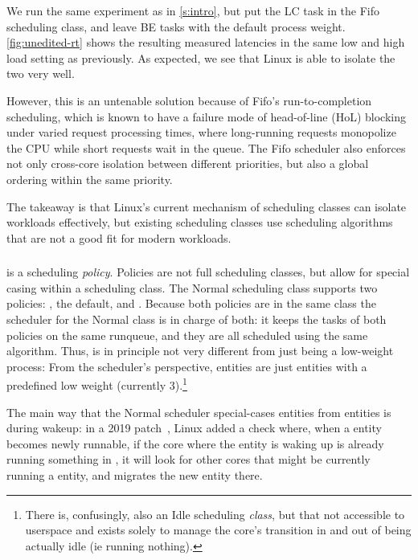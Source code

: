 We run the same experiment as in \autoref{s:intro}, but put the LC task in the
Fifo scheduling class, and leave BE tasks with the default process weight.
\autoref{fig:unedited-rt} shows the resulting measured latencies in the same low
and high load setting as previously. As expected, we see that Linux is able to
isolate the two very well. 

However, this is an untenable solution because of Fifo's run-to-completion
scheduling, which is known to have a failure mode of head-of-line (HoL) blocking
under varied request processing times, where long-running requests monopolize
the CPU while short requests wait in the queue. The Fifo scheduler also enforces
not only cross-core isolation between different priorities, but also a global
ordering within the same priority.

The takeaway is that Linux's current mechanism of scheduling classes can isolate
workloads effectively, but existing scheduling classes use scheduling
algorithms that are not a good fit for modern workloads.

\subsubsection{\schedidle}

\schedidle{} is a scheduling \textit{policy}. Policies are not full scheduling
classes, but allow for special casing within a scheduling class. The Normal
scheduling class supports two policies: \schednormal{}, the default, and
\schedidle{}. Because both policies are in the same class the scheduler for the
Normal class is in charge of both: it keeps the tasks of both policies on the
same runqueue, and they are all scheduled using the same algorithm. Thus,
\schedidle{} is in principle not very different from just being a low-weight
process: From the scheduler's perspective, \schedidle{} entities are just
entities with a predefined low weight (currently 3).\footnote{There is,
confusingly, also an Idle scheduling \textit{class}, but that not accessible to
userspace and exists solely to manage the core's transition in and out of being
actually idle (ie running nothing).}

The main way that the Normal scheduler special-cases \schedidle{} entities from
\schednormal{} entities is during wakeup: in a 2019 patch~\cite{TODO}, Linux
added a check where, when a \schednormal{} entity becomes newly runnable, if the
core where the entity is waking up is already running something in
\schednormal{}, it will look for other cores that might be currently running a
\schedidle{} entity, and migrates the new entity there.


